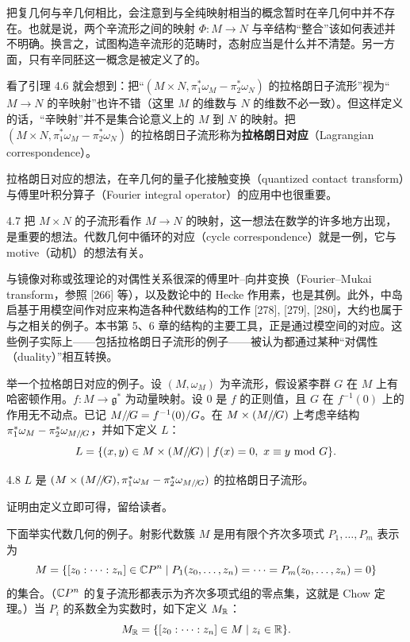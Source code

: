 把复几何与辛几何相比，会注意到与全纯映射相当的概念暂时在辛几何中并不存在。也就是说，两个辛流形之间的映射 $\Phi:M\to N$ 与辛结构“整合”该如何表述并不明确。换言之，试图构造辛流形的范畴时，态射应当是什么并不清楚。另一方面，只有辛同胚这一概念是被定义了的。

看了引理 4.6 就会想到：把“$(M\times N,\pi_1^*\omega_M-\pi_2^*\omega_N)$ 的拉格朗日子流形”视为“$M\to N$ 的辛映射”也许不错（这里 $M$ 的维数与 $N$ 的维数不必一致）。但这样定义的话，“辛映射”并不是集合论意义上的 $M$ 到 $N$ 的映射。把 $(M\times N,\pi_1^*\omega_M-\pi_2^*\omega_N)$ 的拉格朗日子流形称为\textbf{拉格朗日对应}（Lagrangian correspondence）。

拉格朗日对应的想法，在辛几何的量子化接触变换（quantized contact transform）与傅里叶积分算子（Fourier integral operator）的应用中也很重要。

\begin{remark}{4.7}
  把 $M\times N$ 的子流形看作 $M\to N$ 的映射，这一想法在数学的许多地方出现，是重要的想法。代数几何中循环的对应（cycle correspondence）就是一例，它与 motive（动机）的想法有关。

  与镜像对称或弦理论的对偶性关系很深的傅里叶–向井变换（Fourier–Mukai transform，参照 [266] 等），以及数论中的 Hecke 作用素，也是其例。此外，中岛启基于用模空间作对应来构造各种代数结构的工作 [278], [279], [280]，大约也属于与之相关的例子。本书第 5、6 章的结构的主要工具，正是通过模空间的对应。这些例子实际上——包括拉格朗日子流形的例子——被认为都通过某种“对偶性（duality）”相互转换。
\end{remark}

举一个拉格朗日对应的例子。设 $(M,\omega_M)$ 为辛流形，假设紧李群 $G$ 在 $M$ 上有哈密顿作用。$f:M\to\mathfrak{g}^*$ 为动量映射。设 $0$ 是 $f$ 的正则值，且 $G$ 在 $f^{-1}(0)$ 上的作用无不动点。已记 ${M}/\!/\!{G}=f^{-1}(0)/G$。在 $M\times({M}/\!/\!{G})$ 上考虑辛结构 $\pi_1^*\omega_M-\pi_2^*\omega_{{M}/\!/\!{G}}$，并如下定义 $L$：
\[
  L=\{(x,y)\in M\times({M}/\!/\!{G})\mid f(x)=0,\ x\equiv y\ \mathrm{mod}\ G\}.
\]

\begin{lemma}{4.8}
  $L$ 是 $(M\times({M}/\!/\!{G}),\pi_1^*\omega_M-\pi_2^*\omega_{{M}/\!/\!{G}})$ 的拉格朗日子流形。
\end{lemma}

证明由定义立即可得，留给读者。

下面举实代数几何的例子。射影代数簇 $M$ 是用有限个齐次多项式 $P_1,\dots,P_m$ 表示为
\[
  M=\{[z_0:\dots:z_n]\in\mathbb{C}P^n\mid P_1(z_0,\dots,z_n)=\dots=P_m(z_0,\dots,z_n)=0\}
\]
的集合。（$\mathbb{C}P^n$ 的复子流形都表示为齐次多项式组的零点集，这就是 Chow 定理。）当 $P_i$ 的系数全为实数时，如下定义 $M_{\mathbb{R}}$：
\[
  M_{\mathbb{R}}=\{[z_0:\dots:z_n]\in M\mid z_i\in\mathbb{R}\}.
\]

